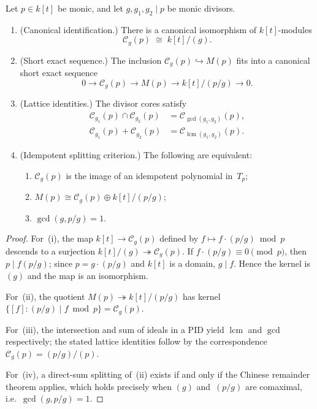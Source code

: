 \begin{theorem}
\label{thm:divisor-core-calculus-inv}
Let $p \in k[t]$ be monic, and let $g,g_1,g_2 \mid p$ be monic
divisors.
\begin{enumerate}[label=\textup{(\roman*)}]
\item \textup{(Canonical identification.)} There is a canonical
 isomorphism of $k[t]$-modules
 \[
 \mathcal{C}_g(p) \;\cong\; k[t]/(g).
 \]
\item \textup{(Short exact sequence.)} The inclusion
 $\mathcal{C}_g(p) \hookrightarrow M(p)$ fits into a canonical
 short exact sequence
 \[
 0 \longrightarrow \mathcal{C}_g(p)
 \longrightarrow M(p)
 \longrightarrow k[t]/(p/g)
 \longrightarrow 0.
 \]
\item \textup{(Lattice identities.)} The divisor cores satisfy
 \begin{align*}
 \mathcal{C}_{g_1}(p) \cap \mathcal{C}_{g_2}(p)
 &= \mathcal{C}_{\gcd(g_1,g_2)}(p), \\
 \mathcal{C}_{g_1}(p) + \mathcal{C}_{g_2}(p)
 &= \mathcal{C}_{\operatorname{lcm}(g_1,g_2)}(p).
 \end{align*}
\item \textup{(Idempotent splitting criterion.)} The following
 are equivalent:
 \begin{enumerate}[label=\textup{(\alph*)}]
 \item $\mathcal{C}_g(p)$ is the image of an idempotent
 polynomial in~$T_p$;
 \item $M(p) \cong \mathcal{C}_g(p) \oplus k[t]/(p/g)$;
 \item $\gcd(g, p/g) = 1$.
 \end{enumerate}
\end{enumerate}
\end{theorem}

\begin{proof}
For~(i), the map $k[t] \to \mathcal{C}_g(p)$ defined by
$f \mapsto f \cdot (p/g) \bmod p$ descends to a surjection
$k[t]/(g) \twoheadrightarrow \mathcal{C}_g(p)$. If
$f \cdot (p/g) \equiv 0 \pmod{p}$, then $p \mid f(p/g)$;
since $p = g \cdot (p/g)$ and $k[t]$ is a domain,
$g \mid f$. Hence the kernel is~$(g)$ and the map is an
isomorphism.

For~(ii), the quotient $M(p) \twoheadrightarrow k[t]/(p/g)$
has kernel $\{[f] : (p/g) \mid f \bmod p\} = \mathcal{C}_g(p)$.

For~(iii), the intersection and sum of ideals in a PID yield
$\operatorname{lcm}$ and $\gcd$ respectively; the stated
lattice identities follow by the correspondence
$\mathcal{C}_g(p) = (p/g)/(p)$.

For~(iv), a direct-sum splitting of~(ii) exists if and only if
the Chinese remainder theorem applies, which holds precisely
when $(g)$ and~$(p/g)$ are comaximal, i.e.\ $\gcd(g,p/g)=1$.
\end{proof}

